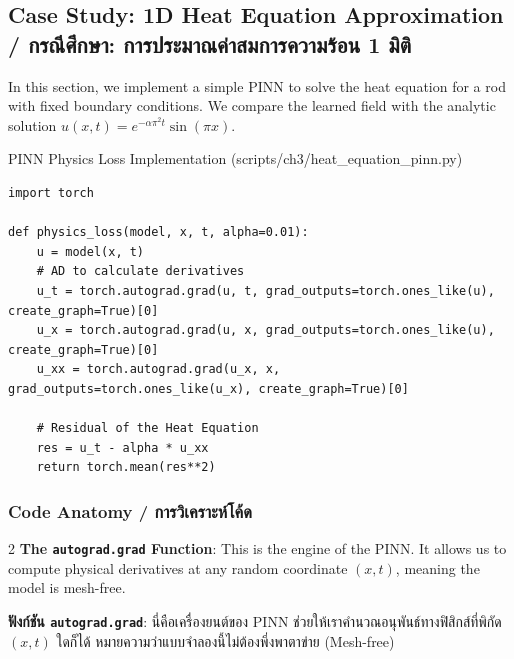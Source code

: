 \subsection{Case Study: 1D Heat Equation Approximation \quad / \quad \textthai{กรณีศึกษา: การประมาณค่าสมการความร้อน 1 มิติ}}
In this section, we implement a simple PINN to solve the heat equation for a rod with fixed boundary conditions. We compare the learned field with the analytic solution $u(x, t) = e^{-\alpha \pi^2 t} \sin(\pi x)$.

\begin{pythonbox}{PINN Physics Loss Implementation (scripts/ch3/heat\_equation\_pinn.py)}
\begin{lstlisting}
import torch

def physics_loss(model, x, t, alpha=0.01):
    u = model(x, t)
    # AD to calculate derivatives
    u_t = torch.autograd.grad(u, t, grad_outputs=torch.ones_like(u), create_graph=True)[0]
    u_x = torch.autograd.grad(u, x, grad_outputs=torch.ones_like(u), create_graph=True)[0]
    u_xx = torch.autograd.grad(u_x, x, grad_outputs=torch.ones_like(u_x), create_graph=True)[0]
    
    # Residual of the Heat Equation
    res = u_t - alpha * u_xx
    return torch.mean(res**2)
\end{lstlisting}
\end{pythonbox}

\subsubsection*{Code Anatomy \quad / \quad \textthai{การวิเคราะห์โค้ด}}
\begin{paracol}{2}
\textbf{The \texttt{autograd.grad} Function}: This is the engine of the PINN. It allows us to compute physical derivatives at any random coordinate $(x, t)$, meaning the model is mesh-free.

\switchcolumn

\begin{thai}
\textbf{ฟังก์ชัน \texttt{autograd.grad}}: นี่คือเครื่องยนต์ของ PINN ช่วยให้เราคำนวณอนุพันธ์ทางฟิสิกส์ที่พิกัด $(x, t)$ ใดก็ได้ หมายความว่าแบบจำลองนี้ไม่ต้องพึ่งพาตาข่าย (Mesh-free)
\end{thai}
\end{paracol}

